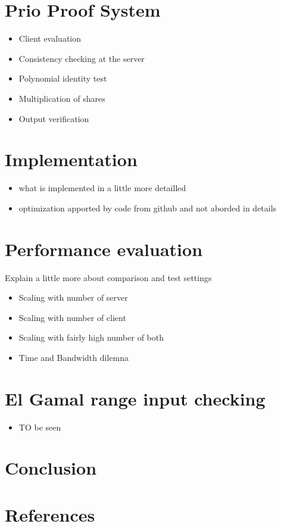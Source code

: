 \documentclass{article}
\begin{document}
\section*{Prio Proof System}
\begin{itemize}


\item Client evaluation
\item Consistency checking at the server
\item Polynomial identity test
\item Multiplication of shares
\item Output verification

\end{itemize}

\section*{Implementation}
\begin{itemize}

\item what is implemented in a little more detailled
\item optimization apported by code from github and not aborded in details


\end{itemize}
\section*{Performance evaluation}

Explain a little more about comparison and test settings


\begin{itemize}


\item Scaling with number of server
\item Scaling with number of client
\item Scaling with fairly high number of both 
\item Time and Bandwidth dilemna

\end{itemize}
\section*{El Gamal range input checking}
\begin{itemize}

\item TO be seen
\end{itemize}
\appendix
\newpage

\newpage
\section*{Conclusion}

\newpage
\section*{References}
\end{document}
